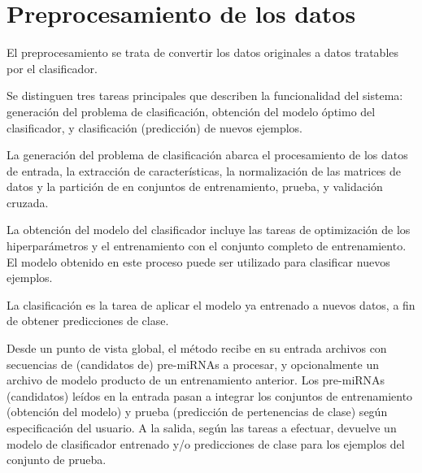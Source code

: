 %
%
%
\section{Preprocesamiento de los datos}
%
El preprocesamiento se trata de convertir los datos originales a
datos tratables por el clasificador.



Se distinguen tres tareas principales que describen la funcionalidad
del sistema: generación del problema de clasificación, obtención del
modelo óptimo del clasificador, y clasificación (predicción) de nuevos
ejemplos.

La generación del problema de clasificación abarca el procesamiento de
los datos de entrada, la extracción de características, la
normalización de las matrices de datos y la partición de en conjuntos
de entrenamiento, prueba, y validación cruzada.

La obtención del modelo del clasificador incluye las tareas de
optimización de los hiperparámetros y el entrenamiento con el conjunto
completo de entrenamiento.  El modelo obtenido en este proceso puede
ser utilizado para clasificar nuevos ejemplos.

La clasificación es la tarea de aplicar el modelo ya entrenado a
nuevos datos, a fin de obtener predicciones de clase.

Desde un punto de vista global, el método recibe en su entrada
archivos con secuencias de (candidatos de) pre-miRNAs a procesar, y
opcionalmente un archivo de modelo producto de un entrenamiento
anterior.  Los pre-miRNAs (candidatos) leídos en la entrada pasan a
integrar los conjuntos de entrenamiento (obtención del modelo) y
prueba (predicción de pertenencias de clase) según especificación del
usuario.  A la salida, según las tareas a efectuar, devuelve un modelo
de clasificador entrenado y/o predicciones de clase para los ejemplos
del conjunto de prueba.

